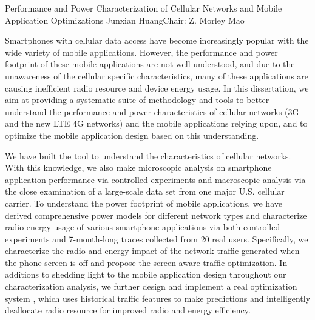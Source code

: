 \startabstractpage
{Performance and Power Characterization of Cellular Networks and Mobile Application Optimizations}
{Junxian Huang}{Chair: Z. Morley Mao}

Smartphones with cellular data access have become increasingly popular with the wide variety of mobile applications. However, the performance and power footprint of these mobile applications are not well-understood, and due to the unawareness of the cellular specific characteristics, many of these applications are causing inefficient radio resource and device energy usage. In this dissertation, we aim at providing a systematic suite of methodology and tools to better understand the performance and power characteristics of cellular networks (3G and the new LTE 4G networks) and the mobile applications relying upon, and to optimize the mobile application design based on this understanding.

We have built the \mobiperf tool to understand the characteristics of cellular networks. With this knowledge, we also make microscopic analysis on smartphone application performance via controlled experiments and macroscopic analysis via the close examination of a large-scale data set from one major U.S. cellular carrier. To understand the power footprint of mobile applications, we have derived comprehensive power models for different network types and characterize radio energy usage of various smartphone applications via both controlled experiments and 7-month-long traces collected from 20 real users. Specifically, we characterize the radio and energy impact of the network traffic generated when the phone screen is off and propose the screen-aware traffic optimization. In additions to shedding light to the mobile application design throughout our characterization analysis, we further design and implement a real optimization system \NAMEFULL, which uses historical traffic features to make predictions and intelligently deallocate radio resource for improved radio and energy efficiency.

\label{Abstract}

